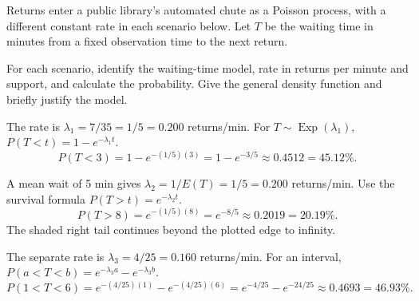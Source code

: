 \clearpage\def\CurrentProblem{charging}
Returns enter a public library's automated chute as a Poisson process, with a different constant rate in each scenario below. Let $T$ be the waiting time in minutes from a fixed observation time to the next return.

For each scenario, identify the waiting-time model, rate in returns per minute and support, and calculate the probability. Give the general density function and briefly justify the model.


\Needspace{8cm}

The rate is $\lambda_1=7/35=1/5=0.200$ returns/min.
For $T\sim\operatorname{Exp}(\lambda_1)$, $P(T<t)=1-e^{-\lambda_1t}$.
\[P(T<3)=1-e^{-(1/5)(3)}=\boxed{1-e^{-3/5}\approx0.4512=45.12\%}.\]

\Needspace{8cm}

A mean wait of 5 min gives $\lambda_2=1/E(T)=1/5=0.200$ returns/min.
Use the survival formula $P(T>t)=e^{-\lambda_2t}$.
\[P(T>8)=e^{-(1/5)(8)}=\boxed{e^{-8/5}\approx0.2019=20.19\%}.\]
The shaded right tail continues beyond the plotted edge to infinity.

\Needspace{8cm}

The separate rate is $\lambda_3=4/25=0.160$ returns/min.
For an interval, $P(a<T<b)=e^{-\lambda_3a}-e^{-\lambda_3b}$.
\[P(1<T<6)=e^{-(4/25)(1)}-e^{-(4/25)(6)}=\boxed{e^{-4/25}-e^{-24/25}\approx0.4693=46.93\%}.\]

